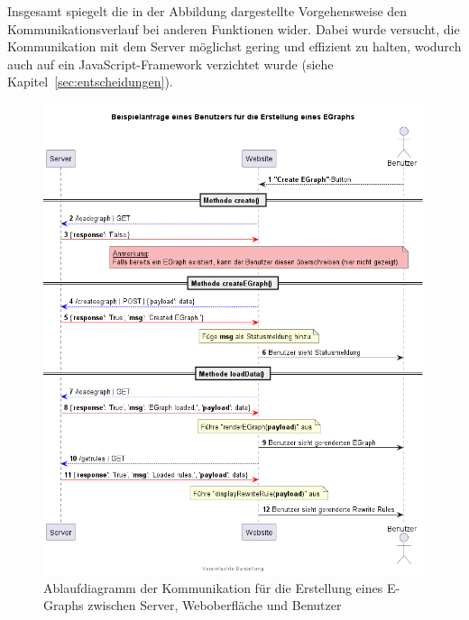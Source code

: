 
Insgesamt spiegelt die in der Abbildung dargestellte Vorgehensweise den Kommunikationsverlauf bei anderen Funktionen wider.
Dabei wurde versucht, die Kommunikation mit dem Server möglichst gering und effizient zu halten, wodurch auch auf ein JavaScript-Framework verzichtet wurde (siehe Kapitel~\ref{sec:entscheidungen}).

\begin{figure}[H]
  \centering
  \includegraphics[scale=0.6]{../fig/query.png}
  \caption{Ablaufdiagramm der Kommunikation für die Erstellung eines E-Graphs zwischen Server, Weboberfläche und Benutzer}
  \label{fig:ablauf}
\end{figure}
